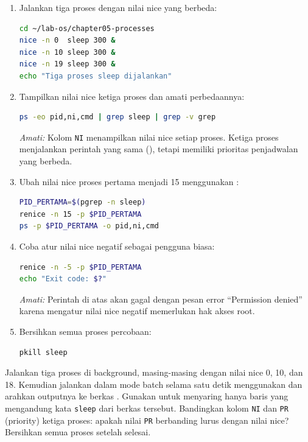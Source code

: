 \begin{enumerate}
    \item Jalankan tiga proses dengan nilai nice yang berbeda:
\begin{lstlisting}[language=bash, caption={Menjalankan proses dengan nice berbeda}]
cd ~/lab-os/chapter05-processes
nice -n 0  sleep 300 &
nice -n 10 sleep 300 &
nice -n 19 sleep 300 &
echo "Tiga proses sleep dijalankan"
\end{lstlisting}

    \item Tampilkan nilai nice ketiga proses dan amati perbedaannya:
\begin{lstlisting}[language=bash, caption={Melihat nilai nice setiap proses}]
ps -eo pid,ni,cmd | grep sleep | grep -v grep
\end{lstlisting}
    \textit{Amati:} Kolom \texttt{NI} menampilkan nilai nice setiap proses. Ketiga proses menjalankan perintah yang sama (), tetapi memiliki prioritas penjadwalan yang berbeda.

    \item Ubah nilai nice proses pertama menjadi 15 menggunakan :
\begin{lstlisting}[language=bash, caption={Mengubah nice proses yang sedang berjalan}]
PID_PERTAMA=$(pgrep -n sleep)
renice -n 15 -p $PID_PERTAMA
ps -p $PID_PERTAMA -o pid,ni,cmd
\end{lstlisting}

    \item Coba atur nilai nice negatif sebagai pengguna biasa:
\begin{lstlisting}[language=bash, caption={Mencoba nice negatif tanpa root}]
renice -n -5 -p $PID_PERTAMA
echo "Exit code: $?"
\end{lstlisting}
    \textit{Amati:} Perintah di atas akan gagal dengan pesan error ``Permission denied'' karena mengatur nilai nice negatif memerlukan hak akses root.

    \item Bersihkan semua proses percobaan:
\begin{lstlisting}[language=bash, caption={Membersihkan proses percobaan}]
pkill sleep
\end{lstlisting}
\end{enumerate}

\begin{challengebox}
Jalankan tiga proses  di background, masing-masing dengan nilai nice 0,
10, dan 18. Kemudian jalankan  dalam mode batch selama satu detik menggunakan
 dan arahkan outputnya ke berkas . Gunakan 
untuk menyaring hanya baris yang mengandung kata \texttt{sleep} dari berkas tersebut.
Bandingkan kolom \texttt{NI} dan \texttt{PR} (priority) ketiga proses: apakah nilai
\texttt{PR} berbanding lurus dengan nilai nice? Bersihkan semua proses setelah selesai.
\end{challengebox}

